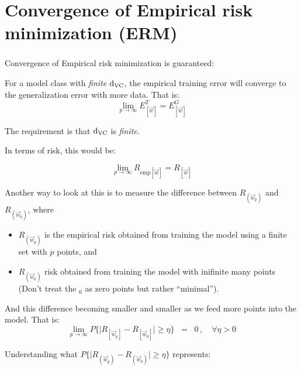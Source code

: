 \section{Convergence of Empirical risk minimization (ERM)}

\begin{frame}\frametitle{\subsecname}\label{sec:convergence_erm}
			
			Convergence of Empirical risk minimization is guaranteed:
			
			For a model class with \emph{finite} $\mathrm{d}_{\mathrm{VC}}$, the empirical training error will converge to the generalization error
			with more data. That is:
			\begin{equation}
				\lim_{p \to \infty}
						E^T_{[\vec w]} = E^G_{[\vec w]}
			\end{equation}
			
			The requirement is that $\mathrm{d}_{\mathrm{VC}}$ is \emph{finite}.
			
			In terms of risk, this would be:
			
			\begin{equation}
				\lim_{p \to \infty} 
					R_{\text{emp}[\vec w]} = R_{[\vec w]}
			\end{equation}
			
			Another way to look at this is to measure the difference between $R_{(\vec w_p)}$ and $R_{(\vec w_0)}$, where
			\begin{itemize}
			\item $R_{(\vec w_p)}$ is the empirical risk obtained from training the model using a finite set with $p$ points, and
			\item $R_{(\vec w_0)}$ risk obtained from training the model with inifinite many points (Don't treat the $_0$ as zero points but rather ``minimal'').
			\end{itemize}
			
			And this difference becoming smaller and smaller as we feed more points into the model. That is:
			\begin{equation}
				\lim_{p \to \infty} P\bigg\{ 
					{
						\Big|R_{[\vec w_p]} - R_{[\vec w_0]}\Big| 
					}
				\geq \eta \bigg\}\;\;=\;\; 0 \,, \quad \forall \eta > 0
				\label{eq:erm_converges_zero}
			\end{equation}
			
			Understanding what $P\bigg\{ 
					{
						\Big|R_{(\vec w_p)} - R_{(\vec w_0)}\Big| 
					}
				\geq \eta \bigg\}$ represents:
			

\end{frame}
